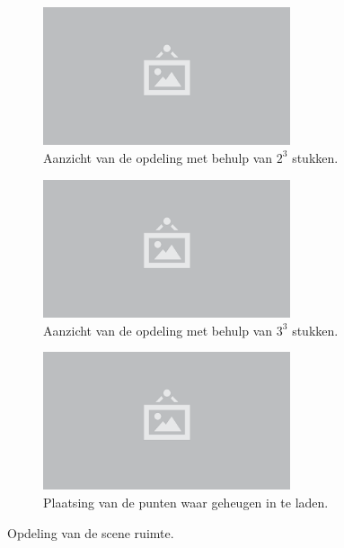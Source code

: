 \begin{figure}
  \centering
  \begin{subfigure}[b]{0.3\textwidth}
  \includegraphics[width=0.8\textwidth]{./img/raw/placeholder.png}
  \caption{Aanzicht van de opdeling met behulp van $2^3$ stukken.}
  \label{fig:vo-subsets:2}
  \end{subfigure}%
  \begin{subfigure}[b]{0.3\textwidth}
  \includegraphics[width=0.8\textwidth]{./img/raw/placeholder.png}
  \caption{Aanzicht van de opdeling met behulp van $3^3$ stukken.}
  \label{fig:vo-subsets:3}
  \end{subfigure}%
  \begin{subfigure}[b]{0.3\textwidth}
  \includegraphics[width=0.8\textwidth]{./img/raw/placeholder.png}
  \caption{Plaatsing van de punten waar geheugen in te laden.}
  \label{fig:vo-subsets:point}
  \end{subfigure}%
  \caption{Opdeling van de scene ruimte.}
  \label{fig:vo-subsets}
\end{figure}
